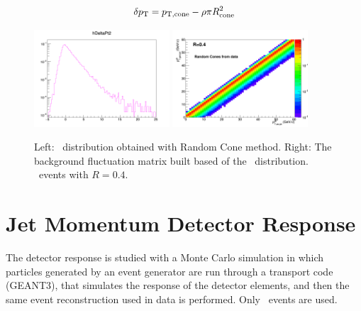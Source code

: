 \begin{equation}
\delta p_{\rm T} = p_{\rm T, cone} - \rho \pi R_{\rm cone}^{2}
\label{edeltapt}
\end{equation}

\begin{figure}[bth]
\centering
\includegraphics[width=0.45\textwidth]{pPbplots/ResponseMatrix/DeltaPt_Djet5Excl}
\includegraphics[width=0.45\textwidth]{pPbplots/ResponseMatrix/BkgMatrix_Djet5Excl}
\caption{Left: \deltapt\ distribution obtained with Random Cone method. Right: The background fluctuation matrix built based of the \deltapt\ distribution. \pPb\ events with $R=0.4$.}
\label{fig:DeltaPt}
\end{figure}


\section{Jet Momentum Detector Response}

The detector response is studied with a Monte Carlo simulation in which particles generated by an event generator are
run through a transport code (GEANT3), that simulates the response of the detector elements, and then the same event reconstruction used in data is performed. Only \ccbar\ events are used.

